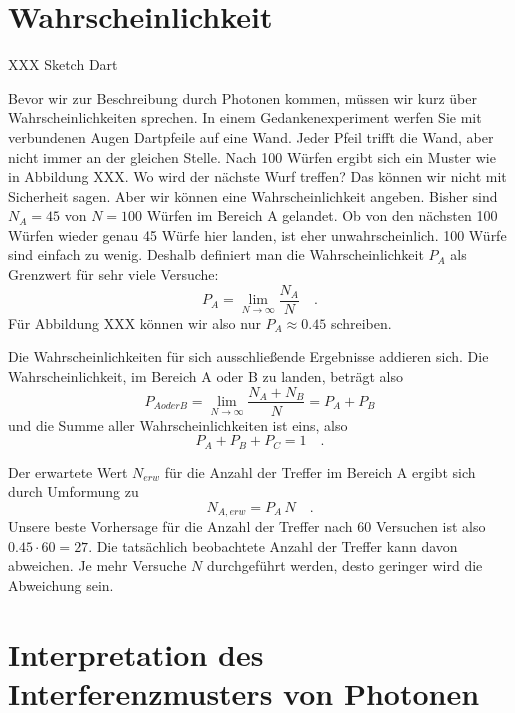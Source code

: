 \section{Wahrscheinlichkeit}

\begin{marginfigure}
    \caption{XXX Sketch Dart}
\end{marginfigure}


Bevor wir zur Beschreibung durch Photonen kommen, müssen wir kurz über Wahrscheinlichkeiten sprechen. In einem Gedankenexperiment werfen Sie mit verbundenen Augen Dartpfeile auf eine Wand. Jeder Pfeil trifft die Wand, aber nicht immer an der gleichen Stelle. Nach 100 Würfen ergibt sich ein Muster wie in Abbildung XXX. Wo wird der nächste Wurf treffen? Das können wir nicht mit Sicherheit sagen. Aber wir können eine Wahrscheinlichkeit angeben. Bisher sind $N_A =45$ von $N = 100$ Würfen im Bereich A gelandet. Ob von den nächsten 100 Würfen wieder genau 45 Würfe hier landen, ist eher unwahrscheinlich. 100 Würfe sind einfach zu wenig. Deshalb definiert man die Wahrscheinlichkeit $P_A$ als Grenzwert für sehr viele Versuche:
\begin{equation}
    P_A =  \lim_{N \rightarrow \infty} \frac{N_A}{N} \quad .
\end{equation}
Für Abbildung XXX können wir also nur $P_A \approx 0.45$ schreiben. 


Die Wahrscheinlichkeiten für sich ausschließende Ergebnisse addieren sich. Die Wahrscheinlichkeit, im Bereich A oder B zu landen, beträgt also
\begin{equation}
    P_{A oder B} = \lim_{N \rightarrow \infty} \frac{N_A + N_B}{N} = P_A + P_B
\end{equation}
und die Summe aller Wahrscheinlichkeiten ist eins, also 
\begin{equation}
    P_A + P_B + P_C = 1 \quad .
\end{equation}

Der erwartete Wert $N_{erw}$ für die Anzahl der Treffer im Bereich A ergibt sich durch Umformung zu 
\begin{equation}
    N_{A, erw} = P_A \, N \quad .
\end{equation}
Unsere beste Vorhersage für die Anzahl der Treffer nach 60 Versuchen ist also $0.45 \cdot 60 = 27 $. Die tatsächlich beobachtete Anzahl der Treffer kann davon abweichen. Je mehr Versuche $N$ durchgeführt werden, desto geringer wird die Abweichung sein.



\section{Interpretation des Interferenzmusters von Photonen }

